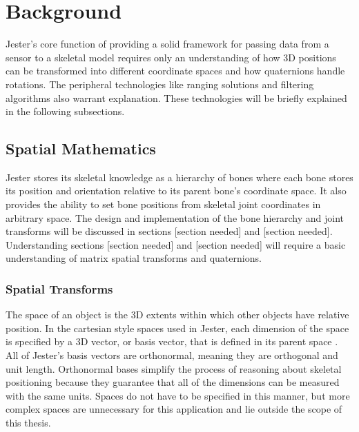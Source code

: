 \chapter{Background}

Jester’s core function of providing a solid framework for passing data from a sensor to a skeletal model requires only an understanding of how 3D positions can be transformed into different coordinate spaces and how quaternions handle rotations. The peripheral technologies like ranging solutions and filtering algorithms also warrant explanation. These technologies will be briefly explained in the following subsections.

\section{Spatial Mathematics}

Jester stores its skeletal knowledge as a hierarchy of bones where each bone stores its position and orientation relative to its parent bone’s coordinate space. It also provides the ability to set bone positions from skeletal joint coordinates in arbitrary space. The design and implementation of the bone hierarchy and joint transforms will be discussed in sections [section needed] and [section needed]. Understanding sections [section needed] and [section needed] will require a basic understanding of matrix spatial transforms and quaternions.

\subsection{Spatial Transforms}

The space of an object is the 3D extents within which other objects have relative position. In the cartesian style spaces used in Jester, each dimension of the space is specified by a 3D vector, or basis vector, that is defined in its parent space \cite{gortler2012foundations}. All of Jester’s basis vectors are orthonormal, meaning they are orthogonal and unit length. Orthonormal bases simplify the process of reasoning about skeletal positioning because they guarantee that all of the dimensions can be measured with the same units. Spaces do not have to be specified in this manner, but more complex spaces are unnecessary for this application and lie outside the scope of this thesis. 

